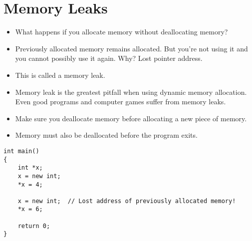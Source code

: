 \documentclass[12pt,a4paper]{article}
\begin{document}
\section{Memory Leaks}
\begin{itemize}
\item What happens if you allocate memory without deallocating memory?
\item Previously allocated memory remains allocated. But you're not using it and you cannot possibly use it again. Why? Lost pointer address.
\item This is called a memory leak.
\item Memory leak is the greatest pitfall when using dynamic memory allocation. Even good programs and computer games suffer from memory leaks.
\item Make sure you deallocate memory before allocating a new piece of memory.
\item Memory must also be deallocated before the program exits.
\end{itemize}
\begin{lstlisting}[caption={Typical Memory Leak}]
int main()
{
	int *x;
	x = new int;
	*x = 4;

	x = new int;  // Lost address of previously allocated memory!
	*x = 6;
	
	return 0;
}
\end{lstlisting}
\end{document}
